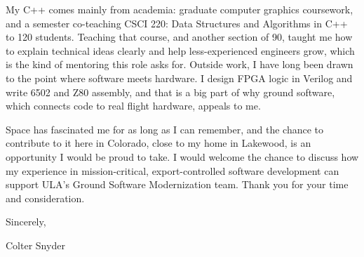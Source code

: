 \documentclass[letterpaper,11pt]{article}
\begin{document}
My C++ comes mainly from academia: graduate computer graphics coursework, and a semester co-teaching
CSCI 220: Data Structures and Algorithms in C++ to 120 students. Teaching that course, and another
section of 90, taught me how to explain technical ideas clearly and help less-experienced engineers
grow, which is the kind of mentoring this role asks for. Outside work, I have long been drawn to the
point where software meets hardware. I design FPGA logic in Verilog and write 6502 and Z80
assembly, and that is a big part of why ground software, which connects code to real flight
hardware, appeals to me.

Space has fascinated me for as long as I can remember, and the chance to contribute to it here in
Colorado, close to my home in Lakewood, is an opportunity I would be proud to take. I would welcome
the chance to discuss how my experience in mission-critical, export-controlled software development
can support ULA's Ground Software Modernization team. Thank you for your time and consideration.

Sincerely,

Colter Snyder
\end{document}
